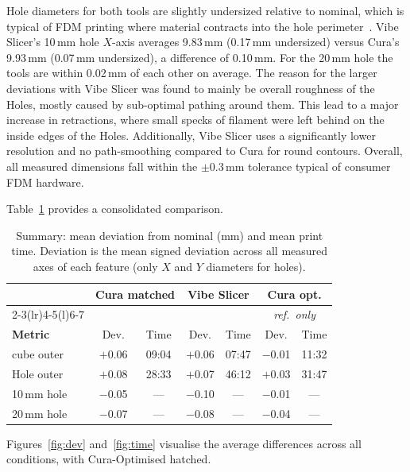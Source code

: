\documentclass[10pt,twocolumn,a4paper]{article}
\begin{document}
Hole diameters for both tools are slightly undersized relative
to nominal, which is typical of FDM printing where material
contracts into the hole perimeter~\cite{gibson2021additive}.
Vibe Slicer's 10\,mm hole $X$-axis averages 9.83\,mm
(0.17\,mm undersized) versus Cura's 9.93\,mm (0.07\,mm undersized),
a difference of 0.10\,mm.
For the 20\,mm hole the tools are within 0.02\,mm of each other
on average. The reason for the larger deviations with Vibe Slicer was found to mainly be overall roughness of the Holes, mostly caused by sub-optimal pathing around them. This lead to a major increase in retractions, where small specks of filament were left behind on the inside edges of the Holes. Additionally, Vibe Slicer uses a significantly lower resolution and no path-smoothing compared to Cura for round contours. Overall, all measured dimensions fall within the $\pm$0.3\,mm tolerance typical of consumer FDM hardware.

Table~\ref{tab:summary} provides a consolidated comparison.

\begin{table}[H]
\centering
\caption{Summary: mean deviation from nominal (mm) and mean
print time. Deviation is the mean signed deviation across all
measured axes of each feature (only $X$ and $Y$ diameters for holes).}
\label{tab:summary}
\footnotesize
\begin{tabular}{@{}lcccc@{\hspace{6pt}}|@{\hspace{6pt}}cc@{}}
\toprule
 & \multicolumn{2}{c}{\textbf{Cura matched}} & \multicolumn{2}{c}{\textbf{Vibe Slicer}} & \multicolumn{2}{c}{\textbf{Cura opt.}} \\
\cmidrule(r){2-3}\cmidrule(lr){4-5}\cmidrule(l){6-7}
 & & & & & \multicolumn{2}{c}{\footnotesize\itshape ref.\ only} \\
\textbf{Metric} & Dev. & Time & Dev. & Time & Dev. & Time\\
\midrule
cube outer & $+$0.06 & 09:04 & $+$0.06 & 07:47 & $-$0.01 & 11:32 \\
Hole outer & $+$0.08 & 28:33 & $+$0.07 & 46:12 & $+$0.03 & 31:47 \\
10\,mm hole & $-$0.05 & — & $-$0.10 & — & $-$0.01 & — \\
20\,mm hole & $-$0.07 & — & $-$0.08 & — & $-$0.04 & — \\
\bottomrule
\end{tabular}
\end{table}

Figures~\ref{fig:dev} and~\ref{fig:time} visualise the average
differences across all conditions, with Cura-Optimised hatched.
\end{document}

